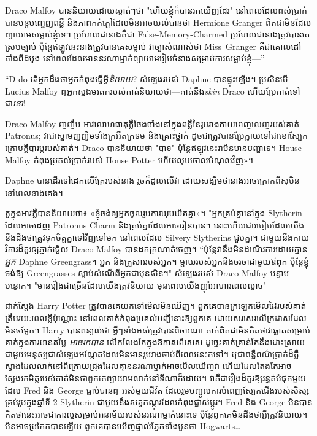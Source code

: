 Draco Malfoy បាននិយាយដោយស្ងាត់ៗថា "ហើយខ្ញុំក៏បានរកឃើញដែរ" នៅពេលដែលពស់ប្រាក់បានបន្តបញ្ចេញពន្លឺ និងភាពកក់ក្តៅដែលមិនអាចយល់បានថា Hermione Granger ពិតជាមិនដែលព្យាយាមសម្លាប់ខ្ញុំទេ។ ប្រហែលជានាងគឺជា False-Memory-Charmed ប្រហែលជានាងត្រូវបានគេស្របច្បាប់ ប៉ុន្តែឥឡូវនេះនាងត្រូវបានគេសម្លាប់ វាច្បាស់ណាស់ថា Miss~Granger គឺជាគោលដៅតាំងពីដំបូង នៅពេលដែលមាននរណាម្នាក់ព្យាយាមរៀបចំនាងសម្រាប់ការសម្លាប់ខ្ញុំ—”

“D-do-តើអ្នកដឹងថាអ្នកកំពុងធ្វើអ្វី\emph{និយាយ}? សំឡេងរបស់ Daphne បានផ្ទុះឡើង។ ប្រសិនបើ Lucius Malfoy ឮអ្នកស្នងមរតករបស់គាត់និយាយថា—គាត់នឹង\emph{skin} Draco ហើយប្រែគាត់ទៅជា\emph{ខោ}!

Draco Malfoy ញញឹម អាវលោហធាតុភ្លឺចែងចាំងនៅក្នុងពន្លឺនៃរូបរាងកាយពេញលេញរបស់គាត់ Patronus; វា​ជា​ស្នាមញញឹម​ទាំង​ក្រអឺតក្រទម និង​គ្រោះថ្នាក់ ដូចជា​ត្រូវបាន​ប្រែក្លាយ​ទៅជា​ខោ​ស្បែក​ក្រោម​ក្តីបារម្ភ​របស់​គាត់។ Draco បាននិយាយថា "បាទ" ប៉ុន្តែឥឡូវនេះវាមិនមានបញ្ហាទេ។ House Malfoy កំពុង​ប្រគល់​ប្រាក់​របស់ House Potter ហើយ​លុប​ចោល​បំណុល​វិញ»។

Daphne បានដើរទៅដេកលើគ្រែរបស់នាង រួចក៏ដួលលើវា ដោយសង្ឃឹមថានាងអាចក្រោកពីសុបិននៅពេលនាងគេង។

តួ​ក្នុង​អាវ​ភ្លឺ​បាន​និយាយ​ថា៖ «ខ្ញុំ​ចង់​ឲ្យ​អ្នក​ចូល​រួម​ការ​ឃុបឃិត​គ្នា»។ "អ្នកគ្រប់គ្នានៅក្នុង Slytherin ដែលអាចដេញ Patronus Charm និងគ្រប់គ្នាដែលអាចរៀនបាន។ នោះហើយជារបៀបដែលយើងនឹងដឹងថាត្រូវទុកចិត្តគ្នាទៅវិញទៅមក នៅពេលដែល Silvery Slytherins ជួបគ្នា។ ជាមួយ​នឹង​កាយវិការ​ដ៏​គួរ​ឲ្យ​ភ្ញាក់​ផ្អើល Draco Malfoy បាន​ដក​ក្រណាត់​ចេញ។ “ប៉ុន្តែវានឹងមិនដំណើរការដោយគ្មាន\emph{អ្នក} Daphne Greengrass។ អ្នក និងគ្រួសាររបស់អ្នក។ ម្តាយរបស់អ្នកនឹងចរចាជាមួយឪពុក ប៉ុន្តែខ្ញុំចង់ឱ្យ Greengrasses ស្តាប់សំណើពីអ្នកជាមុនសិន។" សំឡេងរបស់ Draco Malfoy បន្ទាបបន្ថោក។ "មានរឿងជាច្រើនដែលយើងត្រូវនិយាយ មុនពេលយើងញ៉ាំអាហារពេលល្ងាច"

\later

ជាក់ស្តែង Harry Potter ត្រូវបានគេយកទៅមើលមិនឃើញ។ ពួកគេ​បាន​ក្រឡេក​មើល​ដៃ​របស់​គាត់​ត្រឹម​រយៈពេល​ខ្លី​ប៉ុណ្ណោះ នៅពេល​គាត់​កំពុង​ប្រគល់​បញ្ជី​នោះ​ឱ្យ​ពួកគេ ដោយ​សរសេរ​លើ​ក្រដាស​ដែល​មិន​ចម្លែក។ Harry បានពន្យល់ថា អ្វីៗទាំងអស់ត្រូវបានពិចារណា គាត់ពិតជាមិនគិតថាវាឆ្លាតសម្រាប់គាត់ក្នុងការមានតម្លៃ \emph{អាចរកបាន} លើកលែងតែក្នុងឱកាសពិសេស ដូច្នេះគាត់គ្រាន់តែនឹងដោះស្រាយជាមួយមនុស្សជាសំឡេងអណ្តែតដែលមិនមានរូបរាងចាប់ពីពេលនេះតទៅ។ ឬជាពន្លឺពណ៌ប្រាក់ដ៏ភ្លឺស្វាងដែលលាក់នៅពីក្រោយជ្រុងដែលគ្មាននរណាម្នាក់អាចមើលឃើញវា ហើយដែលតែងតែអាចស្វែងរកមិត្តរបស់គាត់មិនថាពួកគេព្យាយាមលាក់នៅទីណាក៏ដោយ។ វាគឺជារឿងដ៏គួរឱ្យរន្ធត់បំផុតមួយដែល Fred និង George ធ្លាប់បានឮ អស់មួយជីវិត ដែលរួមបញ្ចូលការបំពេញស្បែកជើងរបស់សិស្សគ្រប់រូបក្នុងឆ្នាំទី 2 Slytherin ជាមួយនឹងសត្វកណ្តុរដែលកំពុងផ្លាស់ប្តូរ។ Fred និង George មិន​បាន​គិត​ថា​នេះ​អាច​ជា​ការ​ល្អ​សម្រាប់​អនាម័យ​របស់​នរណា​ម្នាក់​នោះ​ទេ ប៉ុន្តែ​ពួក​គេ​មិន​ដឹង​ថា​អ្វី​ត្រូវ​និយាយ​។ មិនអាចប្រកែកបានឡើយ ពួកគេបានឃើញផ្ទាល់ភ្នែកទាំងបួនថា Hogwarts…

